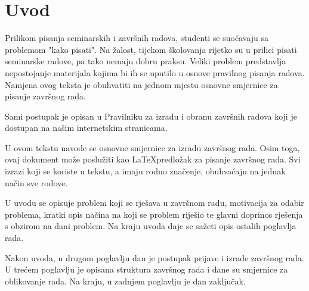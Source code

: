 \section{Uvod}
Prilikom pisanja seminarskih i završnih radova, studenti se suočavaju sa problemom "kako pisati". Na žalost, tijekom školovanja rijetko su u prilici 
pisati seminarske radove, pa tako 
nemaju dobru praksu. Veliki problem predstavlja nepostojanje materijala kojima bi ih se uputilo u osnove pravilnog pisanja radova. Namjena ovog teksta 
je obuhvatiti na jednom 
mjestu osnovne smjernice za pisanje završnog rada.

Sami postupak je opisan u Pravilniku za izradu i obranu završnih radova koji je dostupan na našim internetskim stranicama.



U ovom tekstu navode se osnovne smjernice za izradu završnog rada. Osim toga, ovaj dokument može poslužiti kao \LaTeX predložak za pisanje završnog rada. Svi izrazi koji se koriste u tekstu, a imaju rodno značenje, obuhvaćaju na jednak način sve rodove. 

U uvodu se opisuje problem koji se rješava u završnom radu, motivacija za odabir problema, kratki opis načina na koji se problem riješio te glavni doprinos rješenja s obzirom na dani problem. Na kraju uvoda daje se sažeti opis ostalih poglavlja rada. 

Nakon uvoda, u drugom poglavlju dan je postupak prijave i izrade završnog rada. U trećem 
poglavlju je opisana struktura završnog rada i dane su smjernice za oblikovanje rada. Na kraju, u zadnjem poglavlju je dan zaključak.


 